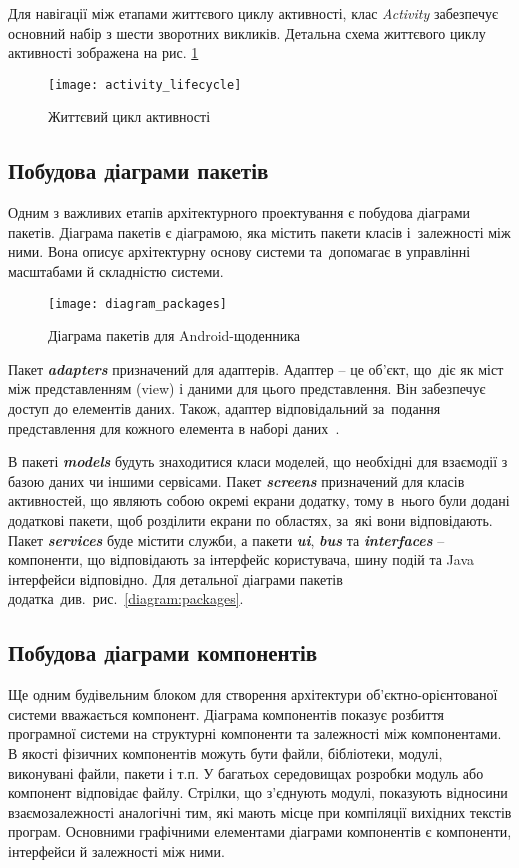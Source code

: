 \documentclass[../main.tex]{subfiles}
\begin{document}
Для навігації між етапами життєвого циклу активності, клас \textit{Activity} забезпечує основний набір з шести зворотних викликів. Детальна схема життєвого циклу активності зображена  на рис. \ref{diagram:activity_lifecycle}

\begin{figure}[H]
	\centering
	\texttt{[image: activity\_lifecycle]}
	\caption{Життєвий цикл активності}
	\label{diagram:activity_lifecycle}
\end{figure}

\subsection{Побудова діаграми пакетів}
Одним з важливих етапів архітектурного проектування є побудова діаграми пакетів. Діаграма пакетів є діаграмою, яка містить пакети класів і~залежності між ними. Вона описує архітектурну основу системи та~допомагає в управлінні масштабами й складністю системи. 

\begin{figure}[h]
	\centering
	\texttt{[image: diagram\_packages]}
	\caption{Діаграма пакетів для Android-щоденника}
\end{figure}

Пакет \textit{\textbf{adapters}} призначений для адаптерів. Адаптер -- це об'єкт, що~діє як міст між представленням (view) і даними для цього представлення. Він забезпечує доступ до елементів даних. Також, адаптер відповідальний за~подання представлення для кожного елемента в наборі даних~\cite{adapter}. 

В пакеті \textit{\textbf{models}} будуть знаходитися класи моделей, що необхідні для взаємодії з базою даних чи іншими сервісами. Пакет \textit{\textbf{screens}} призначений для класів активностей, що являють собою окремі екрани додатку, тому в~нього були додані додаткові пакети, щоб розділити екрани по областях, за~які вони відповідають. Пакет \textit{\textbf{services}} буде містити служби, а пакети \textit{\textbf{ui}}, \textit{\textbf{bus}} та \textit{\textbf{interfaces}} -- компоненти, що відповідають за інтерфейс користувача, шину подій та Java інтерфейси відповідно. Для детальної діаграми пакетів додатка~див.~рис.~\ref{diagram:packages}.

\subsection{Побудова діаграми компонентів}
Ще одним будівельним блоком для створення архітектури \mbox{об'єктно-орієнтованої} системи вважається компонент. Діаграма компонентів показує розбиття програмної системи на структурні компоненти та залежності між компонентами. В якості фізичних компонентів можуть бути файли, бібліотеки, модулі, виконувані файли, пакети і т.п. У багатьох середовищах розробки модуль або компонент відповідає файлу. Стрілки, що з'єднують модулі, показують відносини взаємозалежності аналогічні тим, які мають місце при компіляції вихідних текстів програм. Основними графічними елементами діаграми компонентів є компоненти, інтерфейси й залежності між ними. 
\end{document}
